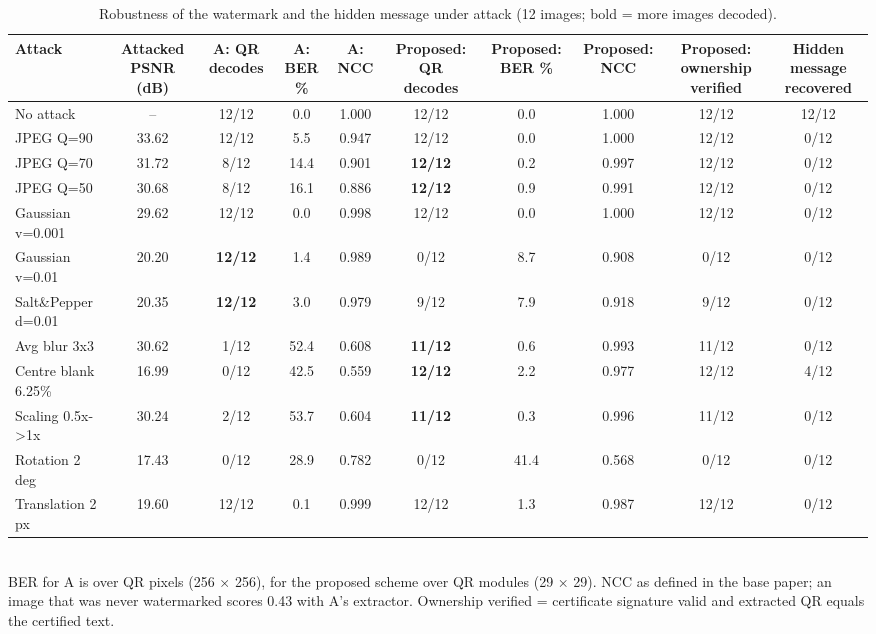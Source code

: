 \begin{table}[t]
\centering
\small
\caption{Robustness of the watermark and the hidden message under attack (12 images; bold = more images decoded).}
\begin{tabular}{lccccccccc}
\toprule
Attack & Attacked PSNR (dB) & A: QR decodes & A: BER \% & A: NCC & Proposed: QR decodes & Proposed: BER \% & Proposed: NCC & Proposed: ownership verified & Hidden message recovered \\
\midrule
No attack & – & 12/12 & 0.0 & 1.000 & 12/12 & 0.0 & 1.000 & 12/12 & 12/12 \\
JPEG Q=90 & 33.62 & 12/12 & 5.5 & 0.947 & 12/12 & 0.0 & 1.000 & 12/12 & 0/12 \\
JPEG Q=70 & 31.72 & 8/12 & 14.4 & 0.901 & \textbf{12/12} & 0.2 & 0.997 & 12/12 & 0/12 \\
JPEG Q=50 & 30.68 & 8/12 & 16.1 & 0.886 & \textbf{12/12} & 0.9 & 0.991 & 12/12 & 0/12 \\
Gaussian v=0.001 & 29.62 & 12/12 & 0.0 & 0.998 & 12/12 & 0.0 & 1.000 & 12/12 & 0/12 \\
Gaussian v=0.01 & 20.20 & \textbf{12/12} & 1.4 & 0.989 & 0/12 & 8.7 & 0.908 & 0/12 & 0/12 \\
Salt\&Pepper d=0.01 & 20.35 & \textbf{12/12} & 3.0 & 0.979 & 9/12 & 7.9 & 0.918 & 9/12 & 0/12 \\
Avg blur 3x3 & 30.62 & 1/12 & 52.4 & 0.608 & \textbf{11/12} & 0.6 & 0.993 & 11/12 & 0/12 \\
Centre blank 6.25\% & 16.99 & 0/12 & 42.5 & 0.559 & \textbf{12/12} & 2.2 & 0.977 & 12/12 & 4/12 \\
Scaling 0.5x->1x & 30.24 & 2/12 & 53.7 & 0.604 & \textbf{11/12} & 0.3 & 0.996 & 11/12 & 0/12 \\
Rotation 2 deg & 17.43 & 0/12 & 28.9 & 0.782 & 0/12 & 41.4 & 0.568 & 0/12 & 0/12 \\
Translation 2 px & 19.60 & 12/12 & 0.1 & 0.999 & 12/12 & 1.3 & 0.987 & 12/12 & 0/12 \\
\bottomrule
\end{tabular}
\\[2pt]\footnotesize BER for A is over QR pixels (256 × 256), for the proposed scheme over QR modules (29 × 29). NCC as defined in the base paper; an image that was never watermarked scores 0.43 with A's extractor. Ownership verified = certificate signature valid and extracted QR equals the certified text.
\end{table}
